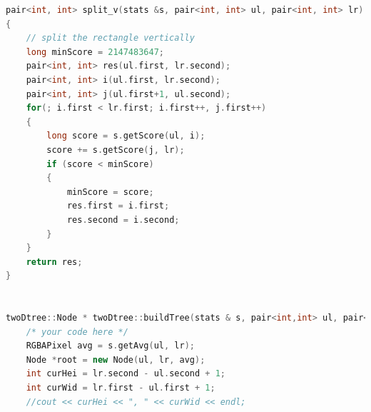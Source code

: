 \documentclass[UTF8]{ctexart}
\begin{document}
\begin{lstlisting}[language=C++,caption={twoDTree.cpp},label={twoDTree.cpp}]
pair<int, int> split_v(stats &s, pair<int, int> ul, pair<int, int> lr)                                                          
{                                                                                                                               
    // split the rectangle vertically                                                                                         
    long minScore = 2147483647;                                                                                                          
    pair<int, int> res(ul.first, lr.second);                                                                                    
    pair<int, int> i(ul.first, lr.second);                                                                                      
    pair<int, int> j(ul.first+1, ul.second);                                                                                    
    for(; i.first < lr.first; i.first++, j.first++)                                                                         
    {                                                                                                                           
        long score = s.getScore(ul, i);                                                                                         
        score += s.getScore(j, lr);                                                                                             
        if (score < minScore)                                                                                                   
        {                                                                                                                       
            minScore = score;                                                                    
            res.first = i.first;
            res.second = i.second;                                                                                              
        }                                                                                                                       
    }                                                                                                                           
    return res;                                                                                                                 
}        


twoDtree::Node * twoDtree::buildTree(stats & s, pair<int,int> ul, pair<int,int> lr) {
	/* your code here */
    RGBAPixel avg = s.getAvg(ul, lr);
    Node *root = new Node(ul, lr, avg);
    int curHei = lr.second - ul.second + 1;
    int curWid = lr.first - ul.first + 1;
    //cout << curHei << ", " << curWid << endl;
  

\end{lstlisting}
\end{document}
